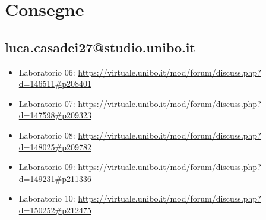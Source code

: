 \documentclass[a4paper,12pt]{report}
\begin{document}
\section*{Consegne}
\subsection{luca.casadei27@studio.unibo.it}
\begin{itemize}
	\item Laboratorio 06: \url{https://virtuale.unibo.it/mod/forum/discuss.php?d=146511#p208401}
	\item Laboratorio 07: \url{https://virtuale.unibo.it/mod/forum/discuss.php?d=147598#p209323}
	\item Laboratorio 08: \url{https://virtuale.unibo.it/mod/forum/discuss.php?d=148025#p209782}
	\item Laboratorio 09: \url{https://virtuale.unibo.it/mod/forum/discuss.php?d=149231#p211336}
	\item Laboratorio 10: \url{https://virtuale.unibo.it/mod/forum/discuss.php?d=150252#p212475}
\end{itemize}
\end{document}
